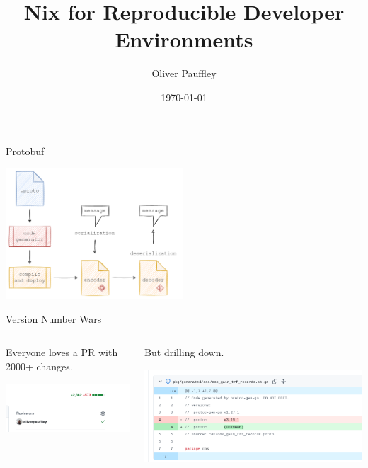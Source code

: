 \documentclass[smaller,aspectratio=169]{beamer}
\author{Oliver Pauffley}
\date{\today}
\title{Nix for Reproducible Developer Environments}
\begin{document}
\maketitle
\begin{frame}[label={sec:org0ea4ea8}]{Protobuf}
\begin{center}
\includegraphics[width=250px]{./what_are_protos.png}
\end{center}
\end{frame}
\begin{frame}[label={sec:org413fbe6}]{Version Number Wars}
\begin{columns}
\begin{column}[t]{0.45\columnwidth}
Everyone loves a PR with 2000+ changes.
\begin{center}
\includegraphics[width=.9\linewidth]{./pr_size.png}
\end{center}
\end{column}
\begin{column}[t]{0.45\columnwidth}
But drilling down.
\begin{center}
\includegraphics[width=.9\linewidth]{./why_big.png}
\end{center}
\end{column}
\end{columns}
\end{frame}
\end{document}
